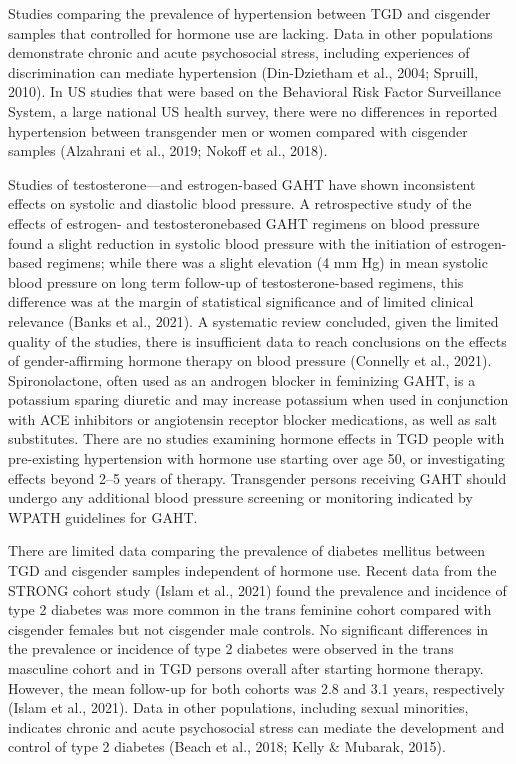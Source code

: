 \documentclass[
]{book}
\begin{document}
Studies comparing the prevalence of hypertension between TGD and cisgender samples that
controlled for hormone use are lacking. Data in
other populations demonstrate chronic and acute
psychosocial stress, including experiences of discrimination can mediate hypertension
(Din-Dzietham et al., 2004; Spruill, 2010). In US
studies that were based on the Behavioral Risk
Factor Surveillance System, a large national US
health survey, there were no differences in
reported hypertension between transgender men
or women compared with cisgender samples
(Alzahrani et al., 2019; Nokoff et al., 2018).

Studies of testosterone---and estrogen-based
GAHT have shown inconsistent effects on systolic
and diastolic blood pressure. A retrospective
study of the effects of estrogen- and testosteronebased GAHT regimens on blood pressure found
a slight reduction in systolic blood pressure with
the initiation of estrogen-based regimens; while
there was a slight elevation (4 mm Hg) in mean
systolic blood pressure on long term follow-up
of testosterone-based regimens, this difference
was at the margin of statistical significance and
of limited clinical relevance (Banks et al., 2021).
A systematic review concluded, given the limited
quality of the studies, there is insufficient data
to reach conclusions on the effects of
gender-affirming hormone therapy on blood pressure (Connelly et al., 2021). Spironolactone, often
used as an androgen blocker in feminizing GAHT,
is a potassium sparing diuretic and may increase
potassium when used in conjunction with ACE
inhibitors or angiotensin receptor blocker medications, as well as salt substitutes. There are no
studies examining hormone effects in TGD people with pre-existing hypertension with hormone
use starting over age 50, or investigating effects
beyond 2--5 years of therapy. Transgender persons
receiving GAHT should undergo any additional
blood pressure screening or monitoring indicated
by WPATH guidelines for GAHT.

There are limited data comparing the prevalence
of diabetes mellitus between TGD and cisgender
samples independent of hormone use. Recent data
from the STRONG cohort study (Islam et al.,
2021) found the prevalence and incidence of type
2 diabetes was more common in the trans feminine cohort compared with cisgender females but
not cisgender male controls. No significant differences in the prevalence or incidence of type 2
diabetes were observed in the trans masculine
cohort and in TGD persons overall after starting
hormone therapy. However, the mean follow-up
for both cohorts was 2.8 and 3.1 years, respectively
(Islam et al., 2021). Data in other populations,
including sexual minorities, indicates chronic and
acute psychosocial stress can mediate the development and control of type 2 diabetes (Beach
et al., 2018; Kelly \& Mubarak, 2015).
\end{document}
